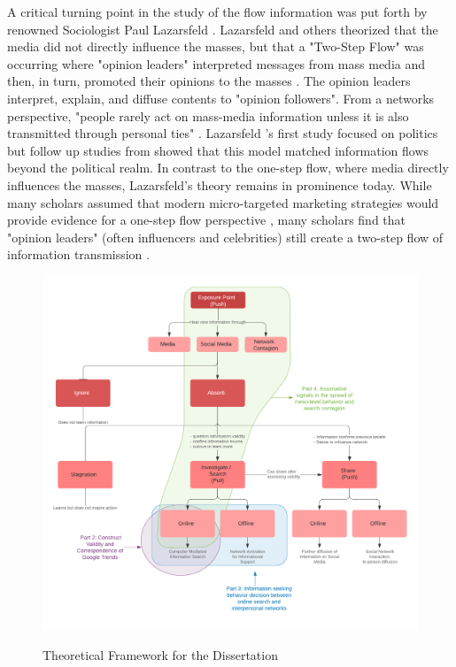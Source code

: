A critical turning point in the study of the flow information was put forth by renowned Sociologist Paul Lazarsfeld \citeyearpar{lazarsfeldPeopleChoice1944}. Lazarsfeld and others theorized that the media did not directly influence the masses, but that a "Two-Step Flow" was occurring where "opinion leaders" interpreted messages from mass media and then, in turn, promoted their opinions to the masses \citep{katzPersonalInfluencePart1955}. The opinion leaders interpret, explain, and diffuse contents to "opinion followers". From a networks
perspective, "people rarely act on mass-media information unless it is also transmitted through personal ties" \citep[p. 1374]{granovetterStrengthWeakTies1973}. Lazarsfeld  \citeyearpar{lazarsfeldPeopleChoice1944}'s first study focused on politics but follow up studies from \citep{katzPersonalInfluencePart1955} showed that this model matched information flows beyond the political realm. In contrast to the one-step flow, where media directly influences the masses, Lazarsfeld's theory remains in prominence today. While many scholars assumed that modern micro-targeted marketing strategies would provide evidence for a one-step flow perspective \citep{bennettOneStepFlowCommunication2006}, many scholars find that "opinion leaders" (often influencers and celebrities) still create a two-step flow of information transmission \citep{choi15, hilbertOneStepTwo2017}.

\begin{figure}
{\centering \includegraphics[width=0.8\linewidth]{figs/ch1/Dissertation Concept Map - Color.png}}
\caption{Theoretical Framework for the Dissertation}\label{fig:concept-map}
\end{figure}

